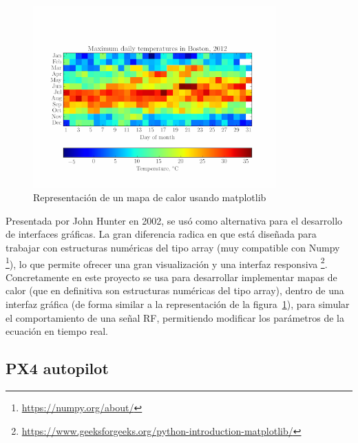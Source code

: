 \begin{figure} [tp]
	\begin{center}
	\includegraphics[height=7cm]{imagenes/cap3/6_matplotlib_app.png}
	\end{center}
	\caption[Representación de un mapa de calor usando matplotlib]{Representación de un mapa de calor usando matplotlib}
	\label{fig:matplotlib}
\end{figure}

Presentada por John Hunter en 2002, se usó como alternativa para el desarrollo de interfaces gráficas. La gran diferencia radica en que está diseñada para trabajar con estructuras numéricas del tipo array (muy compatible con Numpy \footnote[12]{\url{https://numpy.org/about/}}), lo que permite ofrecer una gran visualización y una interfaz responsiva \footnote[13]{\url{https://www.geeksforgeeks.org/python-introduction-matplotlib/}}.\\

Concretamente en este proyecto se usa para desarrollar implementar mapas de calor (que en definitiva son estructuras numéricas del tipo array), dentro de una interfaz gráfica (de forma similar a la representación de la figura~\ref{fig:matplotlib}), para simular el comportamiento de una señal \ac{RF}, permitiendo modificar los parámetros de la ecuación en tiempo real.

\subsection{PX4 autopilot}
\label{subsec:px4}

